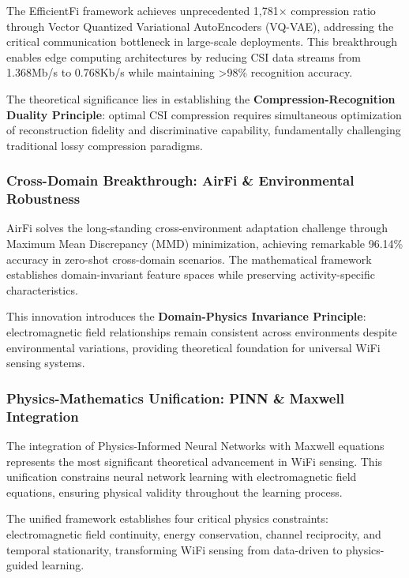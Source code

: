 \documentclass[journal]{IEEEtran}
\begin{document}
The EfficientFi framework \cite{chen2024efficientfi} achieves unprecedented 1,781× compression ratio through Vector Quantized Variational AutoEncoders (VQ-VAE), addressing the critical communication bottleneck in large-scale deployments. This breakthrough enables edge computing architectures by reducing CSI data streams from 1.368Mb/s to 0.768Kb/s while maintaining >98\% recognition accuracy.

The theoretical significance lies in establishing the \textbf{Compression-Recognition Duality Principle}: optimal CSI compression requires simultaneous optimization of reconstruction fidelity and discriminative capability, fundamentally challenging traditional lossy compression paradigms.

\subsubsection{Cross-Domain Breakthrough: AirFi \& Environmental Robustness}

AirFi \cite{wang2022airfi} solves the long-standing cross-environment adaptation challenge through Maximum Mean Discrepancy (MMD) minimization, achieving remarkable 96.14\% accuracy in zero-shot cross-domain scenarios. The mathematical framework establishes domain-invariant feature spaces while preserving activity-specific characteristics.

This innovation introduces the \textbf{Domain-Physics Invariance Principle}: electromagnetic field relationships remain consistent across environments despite environmental variations, providing theoretical foundation for universal WiFi sensing systems.

\subsubsection{Physics-Mathematics Unification: PINN \& Maxwell Integration}

The integration of Physics-Informed Neural Networks with Maxwell equations \cite{raissi2019physics,luo2025physics} represents the most significant theoretical advancement in WiFi sensing. This unification constrains neural network learning with electromagnetic field equations, ensuring physical validity throughout the learning process.

The unified framework establishes four critical physics constraints: electromagnetic field continuity, energy conservation, channel reciprocity, and temporal stationarity, transforming WiFi sensing from data-driven to physics-guided learning.
\end{document}
